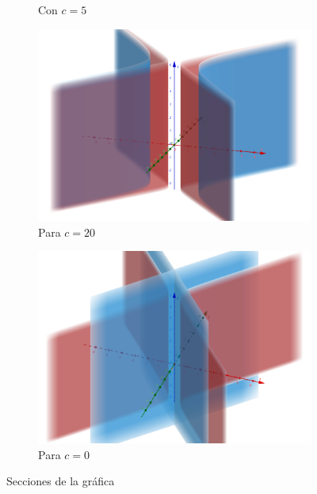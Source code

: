 \documentclass[letterpaper,11pt]{article}
\begin{document}
\begin{enumerate}
\begin{figure}[h!]
\begin{subfigure}{0.3\textwidth}
		\caption{Con $ c = 5 $}
	\end{subfigure}
	\begin{subfigure}{0.3\textwidth}
		\includegraphics[width=\linewidth]{img/2c2}
		\caption{Para $ c = 20 $}
	\end{subfigure}
	\begin{subfigure}{0.3\textwidth}
		\includegraphics[width=\linewidth]{img/2c3}
		\caption{Para $ c = 0 $}
	\end{subfigure}
	\caption{Secciones de la gráfica }
\end{figure}
\begin{figure}[h!]
	\centering
	\begin{subfigure}{.7\textwidth}
		\centering

\end{subfigure}
\end{figure}
\end{enumerate}
\end{document}
